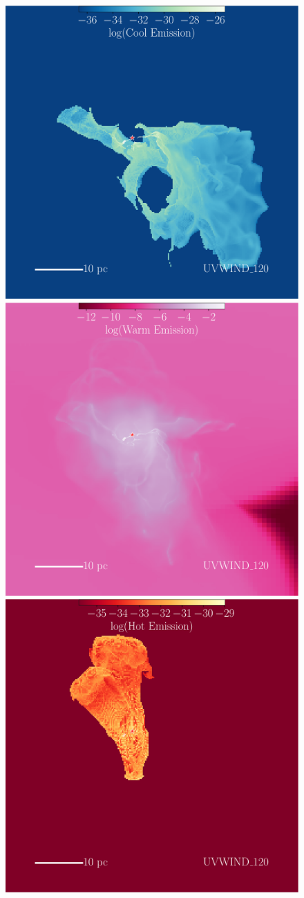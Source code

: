 \documentclass[a4paper,fleqn,usenatbib]{mnras}
\begin{document}
\begin{figure}
	\centerline{\includegraphics[width=0.66\columnwidth]{plots/fig10a.pdf} \includegraphics[width=0.66\columnwidth]{plots/fig10b.pdf}
	\includegraphics[width=0.66\columnwidth]{plots/fig10c.pdf}}

\end{figure}
\end{document}
